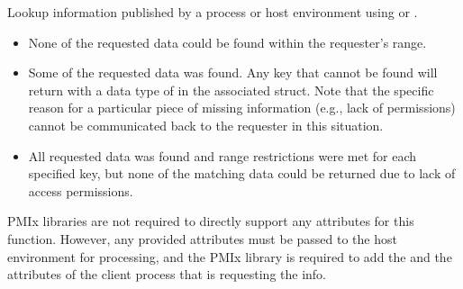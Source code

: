 \summary

Lookup information published by a process or host environment using  or .

\format


\begin{arglist}
\end{arglist}

\returnstart
\begin{itemize}
\item {} None of the requested data could be found within the requester's range.

\item {} Some of the requested data was found.
Any key that cannot be found will return with a data type of  in the associated  struct. Note that the specific reason for a particular piece of missing information (e.g., lack of permissions) cannot be communicated back to the requester in this situation.

\item {} All requested data was found and range restrictions were met for each specified key, but none of the matching data could be returned due to lack of access permissions.

\end{itemize}
\returnend

\reqattrstart
\ac{PMIx} libraries are not required to directly support any attributes for this function. However, any provided attributes must be passed to the host environment for processing, and the \ac{PMIx} library is required to add the  and the  attributes of the client process that is requesting the info.

\reqattrend

